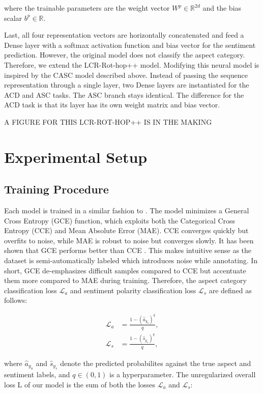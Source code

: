 \documentclass[american, oneside]{ecsgdp}
\begin{document}
\noindent where the trainable parameters are the weight vector $W^p \in \mathbb{R}^{2d}$ and the bias scalar $b^p \in \mathbb{R}$. 

Last, all four representation vectors are horizontally concatenated and feed a Dense layer with a softmax activation function and bias vector for the sentiment prediction. However, the original model does not classify the aspect category. Therefore, we extend the LCR-Rot-hop++ model. Modifying this neural model is inspired by the CASC model described above. Instead of passing the sequence representation through a single layer, two Dense layers are instantiated for the ACD and ASC tasks. The ASC branch stays identical. The difference for the ACD task is that its layer has its own weight matrix and bias vector.

A FIGURE FOR THIS LCR-ROT-HOP++ IS IN THE MAKING

\section{Experimental Setup} \label{sec:setup}
\subsection{Training Procedure} \label{sec:training}
Each model is trained in a similar fashion to \textcite{Kumar2021CASC}. The model minimizes a General Cross Entropy (GCE) function, which exploits both the Categorical Cross Entropy (CCE) and Mean Absolute Error (MAE). %
CCE converges quickly but overfits to noise, while MAE is robust to noise but converges slowly. It has been shown that GCE performs better than CCE \parencite{Kumar2021CASC}. This makes intuitive sense as the dataset is semi-automatically labeled which introduces noise while annotating. In short, GCE de-emphasizes difficult samples compared to CCE but accentuate them more compared to MAE during training. Therefore, the aspect category classification loss $\mathcal{L}_a$ and sentiment polarity classification loss $\mathcal{L}_s$ are defined as follows:

\begin{align}
  \mathcal{L}_a & = \frac{1 - \left( \hat{a}_{y_a} \right)^q} {q}, \\
  \mathcal{L}_s & = \frac{1 - \left( \hat{s}_{y_s} \right)^q} {q},
\end{align}

\noindent where $\hat{a}_{y_a}$ and $\hat{s}_{y_s}$ denote the predicted probabilites against the true aspect and sentiment labels, and $q \in (0, 1)$ is a hyperparameter. The unregularized overall loss L of our model is the sum of both the losses $\mathcal{L}_a$ and $\mathcal{L}_s$:
\end{document}
